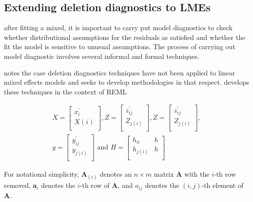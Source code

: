 \documentclass[12pt, a4paper]{report}
\theoremstyle{plain}
\theoremstyle{definition}
\theoremstyle{remark}
\begin{document}
\subsection{Extending deletion diagnostics to LMEs}
after fitting a mixed, it is important to carry put model diagnostics to check whether distributional assumptions for the
residuals as satisfied and whether the fit the model is sensitive to unusual assumptions. The process of carrying out model
diagnostic involves several informal and formal techniques.

\citet{Christiansen} notes the case deletion diagnostics techniques have not been applied to linear mixed effects models and seeks to develop methodologies in that respect. \citet{Christiansen} develops these techniques in the context of REML


\begin{eqnarray*}
	X= \left[%
	\begin{array}{c}
		x^\prime_{i} \\
		X(i) \\
	\end{array}%
	\right],
	Z= \left[%
	\begin{array}{c}
		z^\prime_{ij} \\
		Z_{j(i)} \\
	\end{array}%
	\right] ,
	Z = \left[%
	\begin{array}{c}
		z^\prime_{ij} \\
		Z_{j(i)} \\
	\end{array}%
	\right], \\
	y = \left[%
	\begin{array}{c}
		y^\prime_{ij} \\
		y_{j(i)} \\
	\end{array}%
	\right]
	\mbox{ and } H = \left[%
	\begin{array}{cc}
		h_{ii}& h\\
		h_{j(i)} & h\\
	\end{array}%
	\right]
\end{eqnarray*}

For notational simplicity, $\boldsymbol{A}_{(i)}$ denotes an $n
\times m$ matrix  $\boldsymbol{A}$ with the $i$-th row removed,
$\boldsymbol{a}_{i}$ denotes the $i$-th row of $\boldsymbol{A}$,
and $a_{ij}$ denotes the $(i, j)$-th element of $\boldsymbol{A}$.
\end{document}
